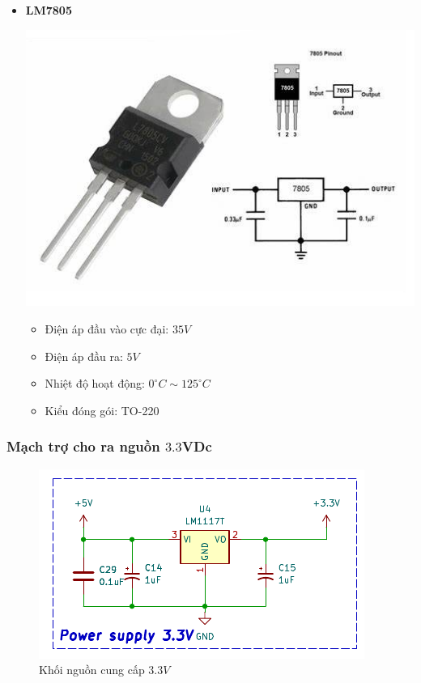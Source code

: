 	\begin{itemize}[label= - ]
		\item \textbf{LM7805}
		
		\begin{minipage}{0.3\linewidth}
			\includegraphics[width=\linewidth]{./picture/lm7805.png}
		\end{minipage}
		\begin{minipage}{0.7\linewidth}
			\begin{itemize}[label = -]
				\item Điện áp đầu vào cực đại: $35V$
				\item Điện áp đầu ra: $5V$
				\item Nhiệt độ hoạt động: $0^{\circ}C \sim 125^{\circ}C$
				\item Kiểu đóng gói: TO-220
			\end{itemize}
		\end{minipage}
	\end{itemize}
	
	\subsubsection{Mạch trợ cho ra nguồn $3.3$VDc}
	
	\begin{figure}[H]
		\centering
		\includegraphics[width=0.7\linewidth]{./picture/power_supply_3V.pdf}
		\caption{Khối nguồn cung cấp $3.3V$}
		\label{power_supply_3.3V_hardware}
	\end{figure}
	
